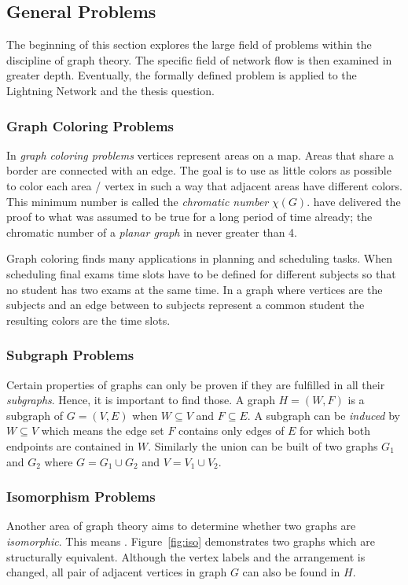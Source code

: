 \documentclass[final]{fhnwreport}       %
\begin{document}
\subsection{General Problems}\label{subsec:genprob}
The beginning of this section explores the large field of problems within the discipline of graph theory. The specific field of network flow is then examined in greater depth. Eventually, the formally defined problem is applied to the Lightning Network and the thesis question.

\subsubsection{Graph Coloring Problems}
In \emph{graph coloring problems} vertices represent areas on a map. Areas that share a border are connected with an edge. The goal is to use as little colors as possible to color each area / vertex in such a way that adjacent areas have different colors. This minimum number is called the \emph{chromatic number} $\chi(G)$. \textcite{steen_four-color_1978} have delivered the proof to what was assumed to be true for a long period of time already; the chromatic number of a \emph{planar graph} in never greater than 4. 

Graph coloring finds many applications in planning and scheduling tasks. When scheduling final exams time slots have to be defined for different subjects so that no student has two exams at the same time. In a graph where vertices are the subjects and an edge between to subjects represent a common student the resulting colors are the time slots.

\subsubsection{Subgraph Problems}
Certain properties of graphs can only be proven if they are fulfilled in all their \emph{subgraphs}. Hence, it is important to find those. A graph $H = (W, F)$ is a subgraph of $G = (V, E)$ when $W \subseteq V$ and $F \subseteq E$. A subgraph can be \emph{induced} by $W \subseteq V$ which means the edge set $F$ contains only edges of $E$ for which both endpoints are contained in $W$. Similarly the union can be built of two graphs $G_1$ and $G_2$ where $G = G_1 \cup G_2$ and $V = V_1 \cup V_2$. 

\subsubsection{Isomorphism Problems}
Another area of graph theory aims to determine whether two graphs are \emph{isomorphic}. This means . Figure~\ref{fig:iso} demonstrates two graphs which are structurally equivalent. Although the vertex labels and the arrangement is changed, all pair of adjacent vertices in graph $G$ can also be found in $H$. 
\end{document}
